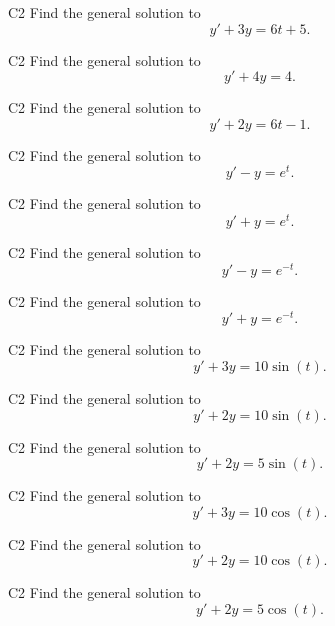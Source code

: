 \begin{problem}{C2}
Find the general solution to
\[
y'+3y=6t+5.
\]
\end{problem}

\begin{problem}{C2}
Find the general solution to
\[
y'+4y=4.
\]
\end{problem}

\begin{problem}{C2}
Find the general solution to
\[
y'+2y=6t-1.
\]
\end{problem}

\begin{problem}{C2}
Find the general solution to
\[
y'-y=e^t.
\]
\end{problem}

\begin{problem}{C2}
Find the general solution to
\[
y'+y=e^t.
\]
\end{problem}

\begin{problem}{C2}
Find the general solution to
\[
y'-y=e^{-t}.
\]
\end{problem}

\begin{problem}{C2}
Find the general solution to
\[
y'+y=e^{-t}.
\]
\end{problem}

\begin{problem}{C2}
Find the general solution to
\[
y'+3y=10\sin(t).
\]
\end{problem}

\begin{problem}{C2}
Find the general solution to
\[
y'+2y=10\sin(t).
\]
\end{problem}

\begin{problem}{C2}
Find the general solution to
\[
y'+2y=5\sin(t).
\]
\end{problem}

\begin{problem}{C2}
Find the general solution to
\[
y'+3y=10\cos(t).
\]
\end{problem}

\begin{problem}{C2}
Find the general solution to
\[
y'+2y=10\cos(t).
\]
\end{problem}

\begin{problem}{C2}
Find the general solution to
\[
y'+2y=5\cos(t).
\]
\end{problem}
